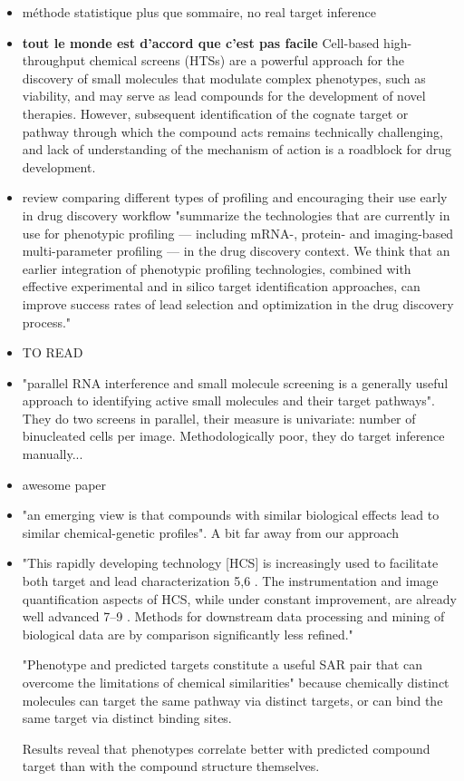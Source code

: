 \documentclass[12pt]{article}
\begin{document}
\begin{itemize}
\item \cite{pmid25181411} méthode statistique plus que sommaire, no real target inference

\item \cite{pmid24183972} \textbf{tout le monde est d'accord que c'est pas facile} Cell-based high-throughput chemical screens (HTSs) are a powerful approach for the discovery of small molecules that modulate complex phenotypes, such as viability, and may serve as lead compounds for the development of novel therapies. However, subsequent identification of the cognate target or pathway through which the compound acts remains technically challenging, and lack of understanding of the mechanism of action is a roadblock for drug development.

\item \cite{pmid19568283} review comparing different types of profiling and encouraging their use early in drug discovery workflow "summarize the 
technologies that are currently in use for phenotypic profiling — including mRNA-, 
protein- and imaging-based multi-parameter profiling — in the drug discovery context. 
We think that an earlier integration of phenotypic profiling technologies, combined with 
effective experimental and in silico target identification approaches, can improve success 
rates of lead selection and optimization in the drug discovery process."

\item \cite{pmid10929718} TO READ

\item \cite{pmid15547975} "parallel RNA interference and small molecule screening is a generally useful approach to
identifying active small molecules and their target pathways". They do two screens in parallel, their measure is univariate: number of binucleated cells per image. Methodologically poor, they do target inference manually...

\item \cite{pmid17401369} awesome paper

\item \cite{pmid16901791} "an emerging view is that compounds with similar biological effects lead to similar chemical-genetic profiles". A bit far away from our approach

\item \cite{pmid18066055} "This rapidly developing
technology [HCS] is increasingly used to facilitate both target and lead
characterization 5,6 . The instrumentation and image quantification
aspects of HCS, while under constant improvement, are already well
advanced 7–9 . Methods for downstream data processing and mining of
biological data are by comparison significantly less refined." 

"Phenotype and predicted targets constitute a useful SAR pair that can overcome the limitations of chemical similarities" because chemically distinct molecules can target the same pathway via distinct targets, or can bind the same target via distinct binding sites.

Results reveal that phenotypes correlate better with predicted compound target than with the compound structure themselves.

\end{itemize}
\end{document}
